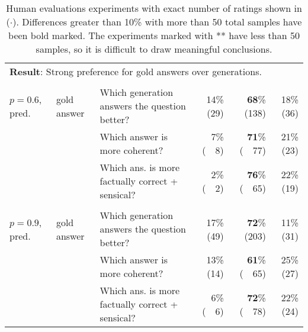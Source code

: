 \documentclass[11pt]{article}
\begin{document}
\begin{table*}[t]
\begin{center}
\begin{tabular}{ lllrrr }
 \multicolumn{6}{l}{\textbf{Result}: Strong preference for gold answers over generations.} \\\\
  $p=0.6$, pred. & gold answer & Which generation answers the question better? & 14\% (29) & \textbf{68}\% (138) & 18\% (36) \\
   & & Which answer is more coherent? & 7\% (~~8) & \textbf{71}\% (~~77) & 21\% (23) \\
      & & Which ans. is more factually correct + sensical? & 2\% (~~2) & \textbf{76}\% (~~65) & 22\% (19) \\\\
  $p=0.9$, pred. & gold answer & Which generation answers the question better? & 17\% (49) & \textbf{72}\% (203) & 11\% (31) \\
  & & Which answer is more coherent? & 13\% (14) & \textbf{61}\% (~~65) & 25\% (27) \\
   & & Which ans. is more factually correct + sensical? & 6\% (~~6) & \textbf{72}\% (~~78) & 22\% (24) \\
\bottomrule
\end{tabular}
\end{center}
\caption{Human evaluations experiments with exact number of ratings shown in ($\cdot$). Differences greater than 10\% with more than 50 total samples have been bold marked. The experiments marked with ** have less than 50 samples, so it is difficult to draw meaningful conclusions.}
\label{tab:human_evaluation_all}
\end{table*}
\end{document}
